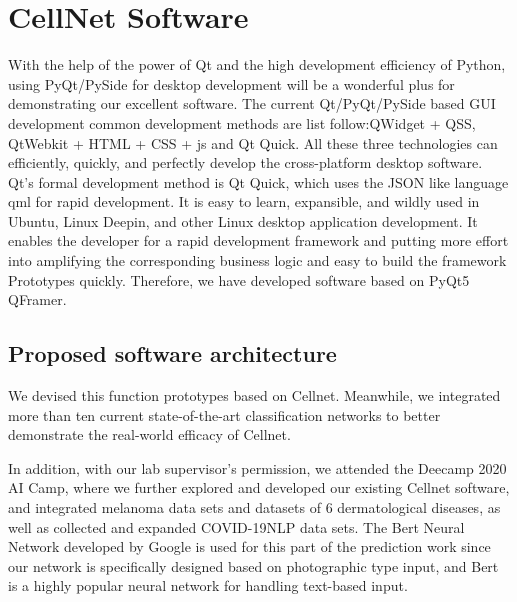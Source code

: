 \section{CellNet Software}
\label{sec:ipsum}
With the help of the power of Qt and the high development efficiency of Python, using PyQt/PySide for desktop development will be a wonderful plus for demonstrating our excellent software.
The current Qt/PyQt/PySide based GUI development common development methods are list follow:QWidget + QSS, QtWebkit + HTML + CSS + js and Qt Quick. All these three technologies can efficiently, quickly, and perfectly develop the cross-platform desktop software. Qt's formal development method is Qt Quick, which uses the JSON like language qml for rapid development. It is easy to learn, expansible, and wildly used in  Ubuntu, Linux Deepin, and other Linux desktop application development. It enables the developer for a rapid development framework and putting more effort into amplifying the corresponding business logic and easy to build the framework Prototypes quickly. Therefore, we have developed software based on PyQt5 QFramer.

\subsection{Proposed software architecture} %
\label{sub:dolor_sit}
We devised this function prototypes based on Cellnet. Meanwhile, we integrated more than ten current state-of-the-art classification networks to better demonstrate the real-world efficacy of Cellnet.

In addition, with our lab supervisor's permission, we attended the Deecamp 2020 AI Camp, where we further explored and developed our existing Cellnet software, and integrated melanoma data sets and datasets of 6 dermatological diseases, as well as collected and expanded COVID-19NLP data sets. The Bert Neural Network developed by Google is used for this part of the prediction work since our network is specifically designed based on photographic type input, and Bert is a highly popular neural network for handling text-based input.

